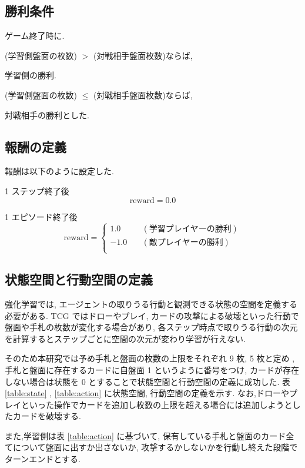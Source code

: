 \documentclass[twocolumn]{jarticle}     %
\begin{document}
\subsection{勝利条件}
ゲーム終了時に.\par
(学習側盤面の枚数) $>$ (対戦相手盤面枚数)ならば,\par
学習側の勝利.\par 
(学習側盤面の枚数) $\leq$ (対戦相手盤面枚数)ならば,\par
対戦相手の勝利とした.\par 

\subsection{報酬の定義}
報酬は以下のように設定した.\par
1 ステップ終了後 
\begin{equation*}
 \mathrm{reward} = 0.0  
\end{equation*}
\par
1 エピソード終了後 
\begin{equation*}
  \mathrm{reward} = 
  \left\{
    \begin{aligned}
        1.0 \quad & (学習プレイヤーの勝利) \\
        -1.0 \quad & (敵プレイヤーの勝利) \\
    \end{aligned}
    \right.
\end{equation*}

\subsection{状態空間と行動空間の定義}
強化学習では, エージェントの取りうる行動と観測できる状態の空間を定義する必要がある. 
TCG ではドローやプレイ, カードの攻撃による破壊といった行動で盤面や手札の枚数が変化する場合があり, 各ステップ時点で取りうる行動の次元を計算するとステップごとに空間の次元が変わり学習が行えない.\par
そのため本研究では予め手札と盤面の枚数の上限をそれぞれ 9 枚, 5 枚と定め , 手札と盤面に存在するカードに自盤面 1 というように番号をつけ, カードが存在しない場合は状態を 0 とすることで状態空間と行動空間の定義に成功した. 表 \ref{table:state} , \ref{table:action} に状態空間, 行動空間の定義を示す.
なお,ドローやプレイといった操作でカードを追加し枚数の上限を超える場合には追加しようとしたカードを破壊する. \par
また,学習側は表 \ref{table:action} に基づいて, 保有している手札と盤面のカード全てについて盤面に出すか出さないか, 攻撃するかしないかを行動し終えた段階でターンエンドとする.
\end{document}
